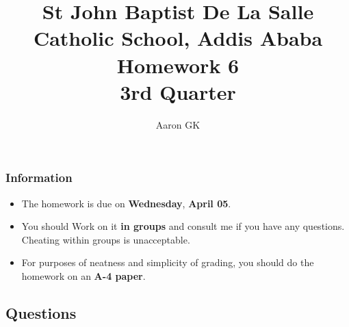 \documentclass[11pt,addpoints]{exam}
\author{Aaron GK}
\begin{document}
	\title{St John Baptist De La Salle Catholic School, Addis Ababa\\
		\large Homework 6 \\
		3rd Quarter}
	\maketitle
	\begin{center}
		\subsubsection*{Information}
		\begin{itemize}
			\item The homework is due on \textbf{Wednesday}, \textbf{April 05}.
			\item You should Work on it \textbf{in groups} and consult me if you have any questions. Cheating within groups is unacceptable.
			\item For purposes of neatness and simplicity of grading, you should do the homework on an \textbf{A-4 paper}.
		\end{itemize}
	\end{center}
	\begin{center}
		\subsection*{Questions}
	\end{center}
\end{document}
